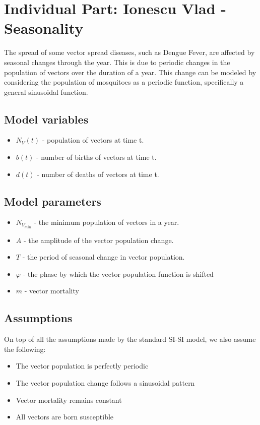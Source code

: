 
\section{Individual Part: Ionescu Vlad - Seasonality}

The spread of some vector spread diseases, such as Dengue Fever, are affected by seasonal changes through the year. This is due to periodic changes in the population of vectors over the duration of a year. This change can be modeled by considering the population of mosquitoes as a periodic function, specifically a general sinusoidal function.
\subsection*{Model variables}
\begin{itemize}
    \item $N_V(t)$ - population of vectors at time t. 
    \item $b(t)$ - number of births of vectors at time t.
    \item $d(t)$ - number of deaths of vectors at time t.
\end{itemize}
\subsection*{Model parameters}
\begin{itemize}
    \item $N_{V_{min}}$ - the minimum population of vectors in a year.
    \item $A$ - the amplitude of the vector population change.
    \item $T$ - the period of seasonal change in vector population.
    \item $\varphi$ - the phase by which the vector population function is shifted
    \item $m$ - vector mortality
\end{itemize}
\subsection*{Assumptions}
On top of all the assumptions made by the standard SI-SI model, we also assume the following:
\begin{itemize}
    \item The vector population is perfectly periodic
    \item The vector population change follows a sinusoidal pattern
    \item Vector mortality remains constant
    \item All vectors are born susceptible
\end{itemize}

